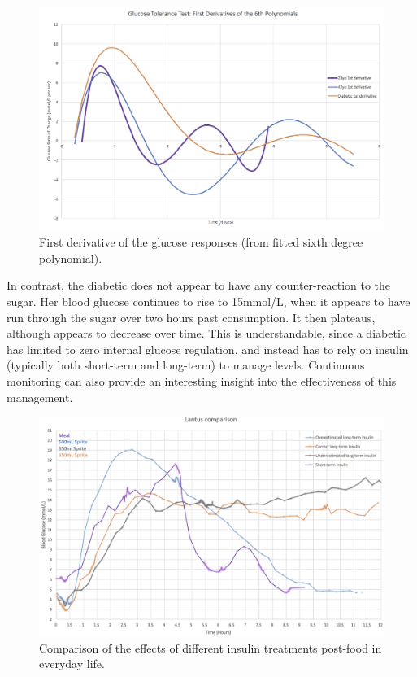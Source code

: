 \begin{figure}[!htb]
\centering\includegraphics[width=1.0\linewidth]{images/derivatives.png}
\caption{First derivative of the glucose responses (from fitted sixth degree polynomial).}
\label{fig:derivatives}
\end{figure}

In contrast, the diabetic does not appear to have any counter-reaction to the sugar. Her blood glucose continues to rise to 15mmol/L, when it appears to have run through the sugar over two hours past consumption. It then plateaus, although appears to decrease over time. This is understandable, since a diabetic has limited to zero internal glucose regulation, and instead has to rely on insulin (typically both short-term and long-term) to manage levels. Continuous monitoring can also provide an interesting insight into the effectiveness of this management. 

\begin{figure}[!htb]
\centering\includegraphics[width=1.0\linewidth]{images/lantuscompare.png}
\caption{Comparison of the effects of different insulin treatments post-food in everyday life.}
\label{fig:lantuscompare}
\end{figure}

